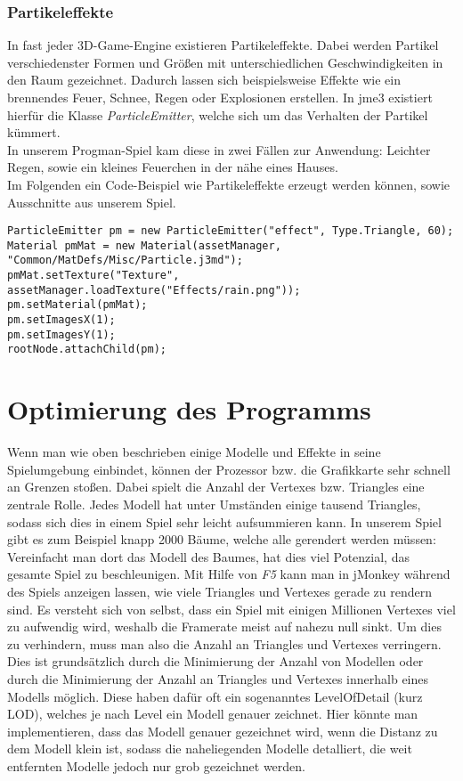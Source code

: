 \subsubsection{Partikeleffekte}
In fast jeder 3D-Game-Engine existieren Partikeleffekte. Dabei werden Partikel verschiedenster Formen und Größen mit unterschiedlichen Geschwindigkeiten in den Raum gezeichnet. Dadurch lassen sich beispielsweise Effekte wie ein brennendes Feuer, Schnee, Regen oder Explosionen erstellen. In jme3 existiert hierfür die Klasse \emph{ParticleEmitter}, welche sich um das Verhalten der Partikel kümmert.\\
In unserem Progman-Spiel kam diese in zwei Fällen zur Anwendung: Leichter Regen, sowie ein kleines Feuerchen in der nähe eines Hauses.\\ Im Folgenden ein Code-Beispiel wie Partikeleffekte erzeugt werden können, sowie Ausschnitte aus unserem Spiel.

\begin{lstlisting}
ParticleEmitter pm = new ParticleEmitter("effect", Type.Triangle, 60);
Material pmMat = new Material(assetManager, "Common/MatDefs/Misc/Particle.j3md");
pmMat.setTexture("Texture", assetManager.loadTexture("Effects/rain.png"));
pm.setMaterial(pmMat);
pm.setImagesX(1);
pm.setImagesY(1);
rootNode.attachChild(pm);
\end{lstlisting}


\section{Optimierung des Programms}\label{sec:optimizing}
Wenn man wie oben beschrieben einige Modelle und Effekte in seine Spielumgebung einbindet, können der Prozessor bzw. die Grafikkarte sehr schnell an Grenzen stoßen. Dabei spielt die Anzahl der Vertexes bzw. Triangles eine zentrale Rolle. Jedes Modell hat unter Umständen einige tausend Triangles, sodass sich dies in einem Spiel sehr leicht aufsummieren kann. In unserem Spiel gibt es zum Beispiel knapp 2000 Bäume, welche alle gerendert werden müssen: Vereinfacht man dort das Modell des Baumes, hat dies viel Potenzial, das gesamte Spiel zu beschleunigen. Mit Hilfe von \emph{F5} kann man in jMonkey während des Spiels anzeigen lassen, wie viele Triangles und Vertexes gerade zu rendern sind. Es versteht sich von selbst, dass ein Spiel mit einigen Millionen Vertexes viel zu aufwendig wird, weshalb die Framerate meist auf nahezu null sinkt. Um dies zu verhindern, muss man also die Anzahl an Triangles und Vertexes verringern. Dies ist grundsätzlich durch die Minimierung der Anzahl von Modellen oder durch die Minimierung der Anzahl an Triangles und Vertexes innerhalb eines Modells möglich. Diese haben dafür oft ein sogenanntes LevelOfDetail (kurz LOD), welches je nach Level ein Modell genauer zeichnet. Hier könnte man implementieren, dass das Modell genauer gezeichnet wird, wenn die Distanz zu dem Modell klein ist, sodass die naheliegenden Modelle detalliert, die weit entfernten Modelle jedoch nur grob gezeichnet werden.

